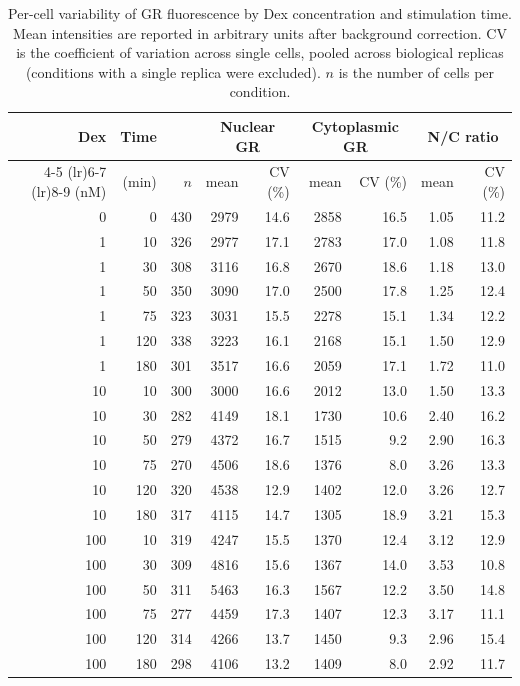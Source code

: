 \begin{table}[h]
\centering
\caption{Per-cell variability of GR fluorescence by Dex concentration and stimulation time. Mean intensities are reported in arbitrary units after background correction. CV is the coefficient of variation across single cells, pooled across biological replicas (conditions with a single replica were excluded). $n$ is the number of cells per condition.}
\label{tab:GR_variability}
\begin{tabular}{r r r r r r r r r}
\toprule
Dex & Time & & \multicolumn{2}{c}{Nuclear GR} & \multicolumn{2}{c}{Cytoplasmic GR} & \multicolumn{2}{c}{N/C ratio} \\
\cmidrule(lr){4-5} \cmidrule(lr){6-7} \cmidrule(lr){8-9}
(nM) & (min) & $n$ & mean & CV (\%) & mean & CV (\%) & mean & CV (\%) \\
\midrule
0 & 0 & 430 & 2979 & 14.6 & 2858 & 16.5 & 1.05 & 11.2 \\
1 & 10 & 326 & 2977 & 17.1 & 2783 & 17.0 & 1.08 & 11.8 \\
1 & 30 & 308 & 3116 & 16.8 & 2670 & 18.6 & 1.18 & 13.0 \\
1 & 50 & 350 & 3090 & 17.0 & 2500 & 17.8 & 1.25 & 12.4 \\
1 & 75 & 323 & 3031 & 15.5 & 2278 & 15.1 & 1.34 & 12.2 \\
1 & 120 & 338 & 3223 & 16.1 & 2168 & 15.1 & 1.50 & 12.9 \\
1 & 180 & 301 & 3517 & 16.6 & 2059 & 17.1 & 1.72 & 11.0 \\
10 & 10 & 300 & 3000 & 16.6 & 2012 & 13.0 & 1.50 & 13.3 \\
10 & 30 & 282 & 4149 & 18.1 & 1730 & 10.6 & 2.40 & 16.2 \\
10 & 50 & 279 & 4372 & 16.7 & 1515 & 9.2 & 2.90 & 16.3 \\
10 & 75 & 270 & 4506 & 18.6 & 1376 & 8.0 & 3.26 & 13.3 \\
10 & 120 & 320 & 4538 & 12.9 & 1402 & 12.0 & 3.26 & 12.7 \\
10 & 180 & 317 & 4115 & 14.7 & 1305 & 18.9 & 3.21 & 15.3 \\
100 & 10 & 319 & 4247 & 15.5 & 1370 & 12.4 & 3.12 & 12.9 \\
100 & 30 & 309 & 4816 & 15.6 & 1367 & 14.0 & 3.53 & 10.8 \\
100 & 50 & 311 & 5463 & 16.3 & 1567 & 12.2 & 3.50 & 14.8 \\
100 & 75 & 277 & 4459 & 17.3 & 1407 & 12.3 & 3.17 & 11.1 \\
100 & 120 & 314 & 4266 & 13.7 & 1450 & 9.3 & 2.96 & 15.4 \\
100 & 180 & 298 & 4106 & 13.2 & 1409 & 8.0 & 2.92 & 11.7 \\
\bottomrule
\end{tabular}
\end{table}
